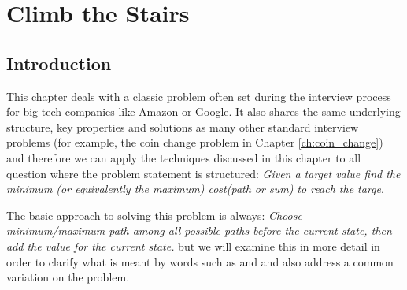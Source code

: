 %

\chapter{Climb the Stairs}
\label{ch:stairs_climbing}
\section*{Introduction}
This chapter deals with a classic problem often set during the interview process for big tech companies like Amazon or Google. It also shares the same underlying structure, key properties and solutions as many other standard interview problems (for example, the coin change problem in Chapter \ref{ch:coin_change}) and therefore we can apply the techniques discussed in this chapter to all question where the problem statement is structured: \textit{Given a target value find the minimum (or equivalently the maximum) cost(path or sum) to reach the targe}.  

The basic approach to solving this problem is always: \textit{Choose minimum/maximum path among all possible paths before the current state, then add the value for the current state.} but we will examine this in more detail in order to clarify what is meant by words such as  and  and also address a common variation on the problem. 

